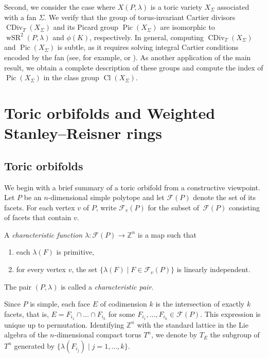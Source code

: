 \documentclass[10pt]{amsart}
\theoremstyle{plain}
\theoremstyle{definition}
\numberwithin{equation}{section}
\newcommand{\ZZ}{\mathbb{Z}}
\DeclareMathOperator{\Pic}{Pic}
\DeclareMathOperator{\wSR}{wSR}
\DeclareMathOperator{\CDiv}{CDiv}
\DeclareMathOperator{\clas}{Cl}
\begin{document}
Second, we consider the case where $X(P, \lambda)$ is a toric variety $X_\Sigma$ associated with a fan $\Sigma$. We  verify that the group of torus-invariant Cartier divisors $\CDiv_T(X_{\Sigma})$ and its Picard group $\Pic(X_{\Sigma})$ are isomorphic to $\wSR^2(P,\lambda)$ and $\phi(K)$, respectively.
In general, computing $\CDiv_T(X_\Sigma)$ and $\Pic(X_\Sigma)$ is subtle, as it requires solving integral Cartier conditions encoded by the fan (see, for example, \cite[Theorem~4.2.8]{CLS} or \cite[Section 3.3]{Ful}). As another application of the main result, 
we obtain a complete description of these groups and compute the index of $\Pic(X_\Sigma)$ in the class group $\clas(X_\Sigma)$.




\section{Toric orbifolds and Weighted Stanley--Reisner rings}\label{sect_preliminary}
\subsection{Toric orbifolds}\label{subsec_toric_orb}
We begin with a brief summary of a toric orbifold from a constructive viewpoint. Let $P$ be an $n$-dimensional simple polytope and let $\mathcal{F}(P)$ denote the set of its facets. For each vertex $v$ of $P$, write $\mathcal{F}_v(P)$ for the subset of~$\mathcal{F}(P)$ consisting of facets that contain $v$.

A \emph{characteristic function} $\lambda\colon \mathcal{F}(P)\to \ZZ^n$ is a map such that
\begin{enumerate}
\item[(i)] each $\lambda(F)$ is primitive, 
\item[(ii)] for every vertex $v$, the set $\{\lambda(F)\mid F\in \mathcal{F}_v(P)\}$ is linearly independent.
\end{enumerate}
The pair $(P,\lambda)$ is called a \emph{characteristic pair}.

Since $P$ is simple, each face $E$ of codimension $k$ is the intersection of exactly $k$ facets, that is, $E=F_{i_1}\cap \dots\cap F_{i_k}$ for some $F_{i_1},\ldots,F_{i_k}\in\mathcal{F}(P)$. This expression is unique up to permutation. Identifying $\ZZ^n$ with the standard lattice in the Lie algebra of the $n$-dimensional compact torus $T^n$, we denote by $T_E$ the subgroup of~$T^n$ generated by $\{\lambda(F_{i_j})\mid j=1, \dots, k\}$. 
\end{document}
